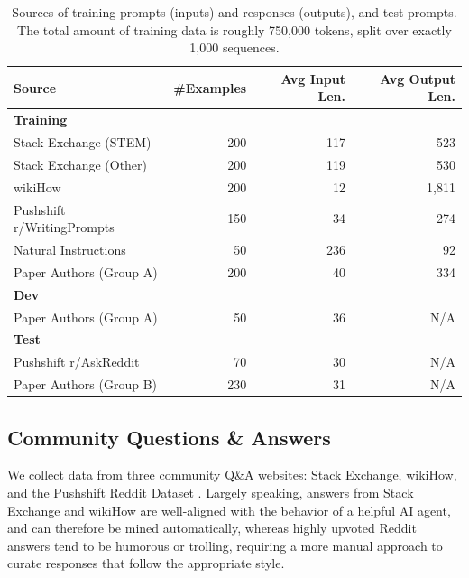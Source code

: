 \begin{table}[t]
    \small
    \centering
    \begin{tabular}{@{}lrrr@{}}
        \toprule
        \textbf{Source} & \textbf{\#Examples} & \textbf{Avg Input Len.} & \textbf{Avg Output Len.} \\
        \midrule
        \textbf{Training} & & & \\
        \quad Stack Exchange (STEM) & 200 & 117 & 523\\
        \quad Stack Exchange (Other) & 200 & 119 & 530 \\
        \quad wikiHow & 200 & 12 & 1,811 \\
        \quad Pushshift r/WritingPrompts & 150 & 34 & 274 \\
        \quad Natural Instructions & 50 & 236 & 92\\
        \quad Paper Authors (Group A) & 200 & 40 & 334 \\
        \midrule
        \textbf{Dev} & & & \\
        \quad Paper Authors (Group A) & 50 & 36 & N/A \\
        \midrule
        \textbf{Test} & & & \\
        \quad Pushshift r/AskReddit & 70 & 30 & N/A \\
        \quad Paper Authors (Group B) & 230 & 31 & N/A \\
        \bottomrule
    \end{tabular}
    \caption{Sources of training prompts (inputs) and responses (outputs), and test prompts. The total amount of training data is roughly 750,000 tokens, split over exactly 1,000 sequences.}
    \label{tab:data_sources}
\end{table}


\subsection{Community Questions \& Answers}
\label{sec:community_data}

We collect data from three community Q\&A websites: Stack Exchange, wikiHow, and the Pushshift Reddit Dataset \citep{baumgartner2020pushshift}.
Largely speaking, answers from Stack Exchange and wikiHow are well-aligned with the behavior of a helpful AI agent, and can therefore be mined automatically, whereas highly upvoted Reddit answers tend to be humorous or trolling, requiring a more manual approach to curate responses that follow the appropriate style.

